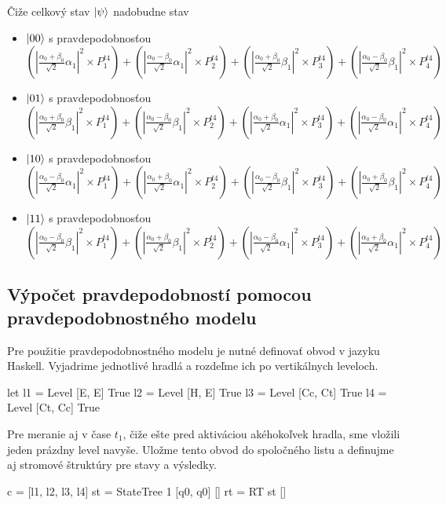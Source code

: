 Čiže celkový stav \(\ket{\psi}\) nadobudne stav
    \begin{itemize}
        \item[] \(\ket{00}\) s pravdepodobnosťou \\
\((|\frac{\alpha_0 + \beta_0}{\sqrt{2}}\alpha_1|^2 \times P^{t4}_1) + (|\frac{\alpha_0 - \beta_0}{\sqrt{2}}\alpha_1|^2 \times P^{t4}_2) + (|\frac{\alpha_0 + \beta_0}{\sqrt{2}}\beta_1|^2 \times P^{t4}_3) + (|\frac{\alpha_0 - \beta_0}{\sqrt{2}}\beta_1|^2 \times P^{t4}_4)\)

        \item[] \(\ket{01}\) s pravdepodobnosťou \\
 \((|\frac{\alpha_0 + \beta_0}{\sqrt{2}}\beta_1|^2 \times P^{t4}_1) + (|\frac{\alpha_0 - \beta_0}{\sqrt{2}}\beta_1|^2 \times P^{t4}_2) + (|\frac{\alpha_0 + \beta_0}{\sqrt{2}}\alpha_1|^2 \times P^{t4}_3) + (|\frac{\alpha_0 - \beta_0}{\sqrt{2}}\alpha_1|^2 \times P^{t4}_4)\)

        \item[] \(\ket{10}\) s pravdepodobnosťou \\ 
\((|\frac{\alpha_0 - \beta_0}{\sqrt{2}}\alpha_1|^2 \times P^{t4}_1) + (|\frac{\alpha_0 + \beta_0}{\sqrt{2}}\alpha_1|^2 \times P^{t4}_2) + (|\frac{\alpha_0 - \beta_0}{\sqrt{2}}\beta_1|^2 \times P^{t4}_3) + (|\frac{\alpha_0 + \beta_0}{\sqrt{2}}\beta_1|^2 \times P^{t4}_4)\)

        \item[] \(\ket{11}\) s pravdepodobnosťou \\
\((|\frac{\alpha_0 - \beta_0}{\sqrt{2}}\beta_1|^2 \times P^{t4}_1) + (|\frac{\alpha_0 + \beta_0}{\sqrt{2}}\beta_1|^2 \times P^{t4}_2) + (|\frac{\alpha_0 - \beta_0}{\sqrt{2}}\alpha_1|^2 \times P^{t4}_3) + (|\frac{\alpha_0 + \beta_0}{\sqrt{2}}\alpha_1|^2 \times P^{t4}_4)\)
    \end{itemize}

\subsection*{Výpočet pravdepodobností pomocou pravdepodobnostného modelu}
Pre použitie pravdepodobnostného modelu je nutné definovať obvod v jazyku 
Haskell. Vyjadrime jednotlivé hradlá a rozdeľme ich po vertikálnych leveloch.
\begin{code}
let l1 = Level [E, E] True
    l2 = Level [H, E] True
    l3 = Level [Cc, Ct] True
    l4 = Level [Ct, Cc] True
\end{code}
Pre meranie aj v čase \(t_1\), čiže ešte pred aktiváciou akéhokoľvek hradla,  
sme vložili jeden prázdny level navyše. Uložme tento obvod do spoločného listu
a definujme aj stromové štruktúry pre stavy a výsledky.
\begin{code}
c = [l1, l2, l3, l4]
st = StateTree 1 [q0, q0] []
rt = RT st []
\end{code}

